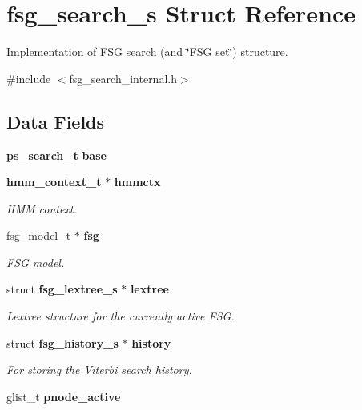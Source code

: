 \section{fsg\+\_\+search\+\_\+s Struct Reference}
\label{structfsg__search__s}


Implementation of F\+S\+G search (and \char`\"{}\+F\+S\+G set\char`\"{}) structure.  




{\ttfamily \#include $<$fsg\+\_\+search\+\_\+internal.\+h$>$}

\subsection*{Data Fields}
\begin{DoxyCompactItemize}
\item 
{\bf ps\+\_\+search\+\_\+t} {\bfseries base}\label{structfsg__search__s_a75f0e3fd5396d62616b9f84eab7ea355}

\item 
{\bf hmm\+\_\+context\+\_\+t} $\ast$ {\bf hmmctx}
\begin{DoxyCompactList}\small\item\em H\+M\+M context. \end{DoxyCompactList}\item 
fsg\+\_\+model\+\_\+t $\ast$ {\bf fsg}\label{structfsg__search__s_ab1877ffe7d77ddb79bab53fb95577946}

\begin{DoxyCompactList}\small\item\em F\+S\+G model. \end{DoxyCompactList}\item 
struct {\bf fsg\+\_\+lextree\+\_\+s} $\ast$ {\bf lextree}\label{structfsg__search__s_ac2c756ff6c1a2f1059011756d22441f8}

\begin{DoxyCompactList}\small\item\em Lextree structure for the currently active F\+S\+G. \end{DoxyCompactList}\item 
struct {\bf fsg\+\_\+history\+\_\+s} $\ast$ {\bf history}\label{structfsg__search__s_abc949ccaab380bcf5b452d1cac54469b}

\begin{DoxyCompactList}\small\item\em For storing the Viterbi search history. \end{DoxyCompactList}\item 
glist\+\_\+t {\bf pnode\+\_\+active}\label{structfsg__search__s_a318ff42978c1e645f01962345ac08215}


\end{DoxyCompactItemize}
